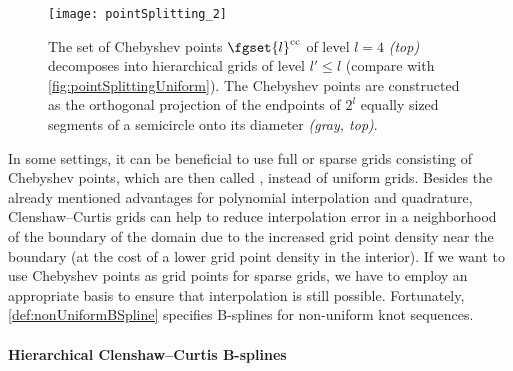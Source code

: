 \begin{figure}
  \texttt{[image: pointSplitting\_2]}%
  \caption[%
    Decomposition of the set of univariate Clenshaw--Curtis grid points%
  ]{%
    The set of Chebyshev points $\fgset{l}^\cc$ of level
    $l = 4$ \emph{(top)}
    decomposes into hierarchical grids of level $l' \le l$
    (compare with \cref{fig:pointSplittingUniform}).
    The Chebyshev points are constructed as
    the orthogonal projection of the
    endpoints of $2^l$ equally sized segments
    of a semicircle onto its diameter \emph{\textcolor{C8}{(gray, top)}}.%
  }%
  \label{fig:pointSplittingChebyshev}%
\end{figure}

In some settings, it can be beneficial to use full or sparse grids consisting
of Chebyshev points, which are then called ,
instead of uniform grids.
Besides the already mentioned advantages for polynomial interpolation and
quadrature, Clenshaw--Curtis grids can help to reduce interpolation
error in a neighborhood of the boundary of the domain due to the increased
grid point density near the boundary
(at the cost of a lower grid point density in the interior).
If we want to use Chebyshev points as grid points for sparse grids,
we have to employ an appropriate basis to ensure that interpolation
is still possible.
Fortunately, \cref{def:nonUniformBSpline} specifies B-splines for non-uniform
knot sequences.

\paragraph{Hierarchical Clenshaw--Curtis B-splines}

